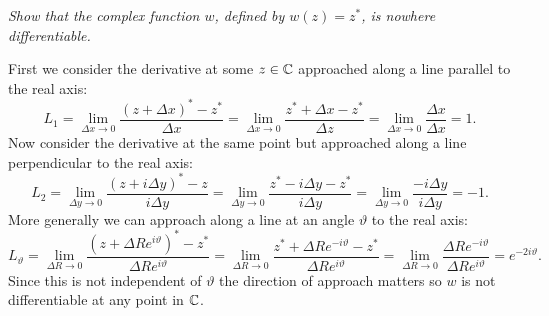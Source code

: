 \documentclass{article}
\begin{document}
    \begin{example}
        \textit{Show that the complex function \(w\), defined by \(w(z) = z^*\), is nowhere differentiable.}
        
        First we consider the derivative at some \(z\in\mathbb{C}\) approached along a line parallel to the real axis:
        \[L_1 = \lim_{\Delta x \to 0} \frac{(z + \Delta x)^* - z^*}{\Delta x} = \lim_{\Delta x \to 0} \frac{z^* + \Delta x - z^*}{\Delta z} = \lim_{\Delta x \to 0}\frac{\Delta x}{\Delta x} = 1.\]
        Now consider the derivative at the same point but approached along a line perpendicular to the real axis:
        \[L_2 = \lim_{\Delta y\to 0} \frac{(z + i\Delta y)^* - z}{i\Delta y} = \lim_{\Delta y \to 0} \frac{z^* - i\Delta y - z^*}{i\Delta y} = \lim_{\Delta y \to 0} \frac{-i\Delta y}{i\Delta y} = -1.\]
        More generally we can approach along a line at an angle \(\vartheta\) to the real axis:
        \[L_\vartheta = \lim_{\Delta R\to 0} \frac{(z + \Delta R e^{i\vartheta})^* - z^*}{\Delta Re^{i\vartheta}} = \lim_{\Delta R\to 0} \frac{z^* + \Delta Re^{-i\vartheta} - z^*}{\Delta Re^{i\vartheta}} = \lim_{\Delta R\to 0} \frac{\Delta Re^{-i\vartheta}}{\Delta Re^{i\vartheta}} = e^{-2i\vartheta}.\]
        Since this is not independent of \(\vartheta\) the direction of approach matters so \(w\) is not differentiable at any point in \(\mathbb{C}\).
    \end{example}
    
\end{document}
